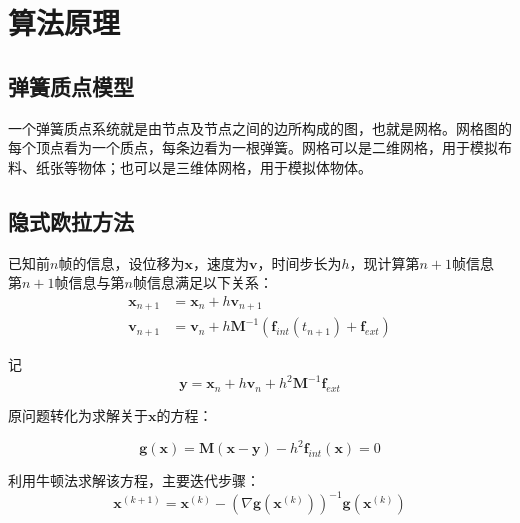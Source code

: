 \documentclass[14pt]{scrartcl} %
\begin{document}
\pagebreak
\section{算法原理}

\subsection{弹簧质点模型}
一个弹簧质点系统就是由节点及节点之间的边所构成的图，也就是网格。网格图的每个顶点看为一个质点，每条边看为一根弹簧。网格可以是二维网格，用于模拟布料、纸张等物体；也可以是三维体网格，用于模拟体物体。

\subsection{隐式欧拉方法}
已知前$n$帧的信息，设位移为$\boldsymbol x$，速度为$\boldsymbol v$，时间步长为$h$，现计算第$n+1$帧信息\\

第$n+1$帧信息与第$n$帧信息满足以下关系：
\begin{equation}
\begin{aligned}
\boldsymbol x_{n+1}&=\boldsymbol x_n+h\boldsymbol  v_{n+1}\\
\boldsymbol v_{n+1}&=\boldsymbol v_n+h\boldsymbol M^{-1}(\boldsymbol f_{int}(t_{n+1})+\boldsymbol f_{ext})
\end{aligned}
\end{equation}

记
\begin{equation}
\boldsymbol y=\boldsymbol x_n+h\boldsymbol v_n+h^2\boldsymbol M^{-1}\boldsymbol f_{ext}
\end{equation}

原问题转化为求解关于$\boldsymbol x$的方程：

\begin{equation}
\boldsymbol g(\boldsymbol x)=\boldsymbol M(\boldsymbol x-\boldsymbol y)-h^2\boldsymbol f_{int}(\boldsymbol x)=0
\end{equation}

利用牛顿法求解该方程，主要迭代步骤：
\begin{equation}
\boldsymbol x^{(k+1)}=\boldsymbol x^{(k)}-(\nabla \boldsymbol g(\boldsymbol x^{(k)}))^{-1}\boldsymbol g(\boldsymbol x^{(k)})
\end{equation}
\end{document}
